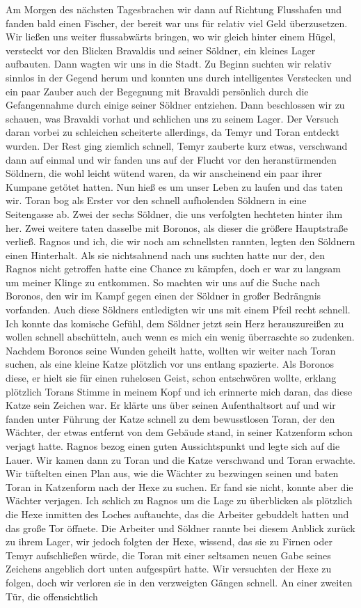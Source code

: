 Am Morgen des nächsten Tagesbrachen wir dann auf Richtung Flusshafen und fanden bald einen Fischer, der bereit war uns für relativ viel Geld überzusetzen. Wir ließen uns weiter flussabwärts bringen, wo wir gleich hinter einem Hügel, versteckt vor den Blicken Bravaldis und seiner Söldner, ein kleines Lager aufbauten. Dann wagten wir uns in die Stadt.
Zu Beginn suchten wir relativ sinnlos in der Gegend herum und konnten uns durch intelligentes Verstecken und ein paar Zauber auch der Begegnung mit Bravaldi persönlich durch die Gefangennahme durch einige seiner Söldner entziehen. Dann beschlossen wir zu schauen, was Bravaldi vorhat und schlichen uns zu seinem Lager. Der Versuch daran vorbei zu schleichen scheiterte allerdings, da Temyr und Toran entdeckt wurden. Der Rest ging ziemlich schnell, Temyr zauberte kurz etwas, verschwand dann auf einmal und wir fanden uns auf der Flucht vor den heranstürmenden Söldnern, die wohl leicht wütend waren, da wir anscheinend ein paar ihrer Kumpane getötet hatten. Nun hieß es um unser Leben zu laufen und das taten wir. Toran bog als Erster vor den schnell aufholenden Söldnern in eine Seitengasse ab. Zwei der sechs Söldner, die uns verfolgten hechteten hinter ihm her. Zwei weitere taten dasselbe mit Boronos, als dieser die größere Hauptstraße verließ. Ragnos und ich, die wir noch am schnellsten rannten, legten den Söldnern einen Hinterhalt. Als sie nichtsahnend nach uns suchten hatte nur der, den Ragnos nicht getroffen hatte eine Chance zu kämpfen, doch er war zu langsam um meiner Klinge zu entkommen. So machten wir uns auf die Suche nach Boronos, den wir im Kampf gegen einen der Söldner in großer Bedrängnis vorfanden. Auch diese Söldners entledigten wir uns mit einem Pfeil recht schnell. Ich konnte das komische Gefühl, dem Söldner jetzt sein Herz herauszureißen zu wollen schnell abschütteln, auch wenn es mich ein wenig überraschte so zudenken. Nachdem Boronos seine Wunden geheilt hatte, wollten wir weiter nach Toran suchen, als eine kleine Katze plötzlich vor uns entlang spazierte. Als Boronos diese, er hielt sie für einen ruhelosen Geist, schon entschwören wollte, erklang plötzlich Torans Stimme in meinem Kopf und ich erinnerte mich daran, das diese Katze sein Zeichen war. Er klärte uns über seinen Aufenthaltsort auf und wir fanden unter Führung der Katze schnell zu dem bewusstlosen Toran, der den Wächter, der etwas entfernt von dem Gebäude stand, in seiner Katzenform schon verjagt hatte. Ragnos bezog einen guten Aussichtspunkt und legte sich auf die Lauer. Wir kamen dann zu Toran und die Katze verschwand und Toran erwachte. Wir tüftelten einen Plan aus, wie die Wächter zu bezwingen seinen und baten Toran in Katzenform nach der Hexe zu suchen. Er fand sie nicht, konnte aber die Wächter verjagen. Ich schlich zu Ragnos um die Lage zu überblicken als plötzlich die Hexe inmitten des Loches auftauchte, das die Arbeiter gebuddelt hatten und das große Tor öffnete. Die Arbeiter und Söldner rannte bei diesem Anblick zurück zu ihrem Lager, wir jedoch folgten der Hexe, wissend, das sie zu Firnen oder Temyr aufschließen würde, die Toran mit einer seltsamen neuen Gabe seines Zeichens angeblich dort unten aufgespürt hatte. Wir versuchten der Hexe zu folgen, doch wir verloren sie in den verzweigten Gängen schnell. An einer zweiten Tür, die offensichtlich 